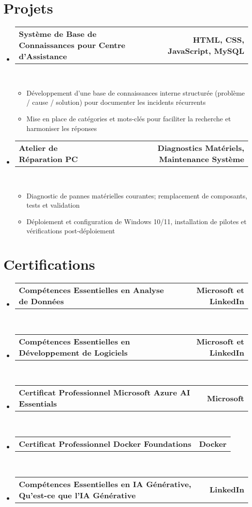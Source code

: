 \documentclass[letterpaper,11pt]{article}
\makeatletter
\newcommand{\resumeItem}[1]{
  \item\small{
    {#1 \vspace{0pt}}
  }
}
\newcommand{\resumeProjectHeading}[2]{
    \item
    \begin{tabular*}{1.001\textwidth}{l@{\extracolsep{\fill}}r}
      \small#1 & \textbf{\small #2}\\
    \end{tabular*}\vspace{-7pt}
}
\newcommand{\resumeSubHeadingListStart}{\begin{itemize}[leftmargin=0.0in, label={}]}
\newcommand{\resumeSubHeadingListEnd}{\end{itemize}}\vspace{0pt}
\newcommand{\resumeItemListStart}{\begin{itemize}}
\newcommand{\resumeItemListEnd}{\end{itemize}\vspace{-5pt}}
\makeatother
\begin{document}
\section{Projets}
    \vspace{-5pt}
    \resumeSubHeadingListStart
    \resumeProjectHeading
            {\textbf{Système de Base de Connaissances pour Centre d'Assistance}}{HTML, CSS, JavaScript, MySQL}
            \\[2mm]
          \resumeItemListStart
            \resumeItem{Développement d'une base de connaissances interne structurée (problème / cause / solution) pour documenter les incidents récurrents}
            \resumeItem{Mise en place de catégories et mots-clés pour faciliter la recherche et harmoniser les réponses}
          \resumeItemListEnd
    \resumeProjectHeading
            {\textbf{Atelier de Réparation PC}}{Diagnostics Matériels, Maintenance Système}
            \\[2mm]
          \resumeItemListStart
            \resumeItem{Diagnostic de pannes matérielles courantes; remplacement de composants, tests et validation}
            \resumeItem{Déploiement et configuration de Windows 10/11, installation de pilotes et vérifications post-déploiement}
          \resumeItemListEnd

\resumeSubHeadingListEnd
\vspace{-28pt}

\section{Certifications}
    \vspace{-5pt}
    \resumeSubHeadingListStart
          \resumeProjectHeading
            {\textbf{{Compétences Essentielles en Analyse de Données}}}{Microsoft et LinkedIn}
            \\[1mm]
          \resumeProjectHeading
            {\textbf{{Compétences Essentielles en Développement de Logiciels}}}{Microsoft et LinkedIn}
            \\[1mm]
          \resumeProjectHeading
            {\textbf{{Certificat Professionnel Microsoft Azure AI Essentials}}}{Microsoft}
            \\[1mm]
          \resumeProjectHeading
            {\textbf{{Certificat Professionnel Docker Foundations}}}{Docker}
            \\[1mm]
          \resumeProjectHeading
            {\textbf{{Compétences Essentielles en IA Générative, Qu'est-ce que l'IA Générative}}}{LinkedIn}
            \\[1mm]
          \resumeSubHeadingListEnd
 \vspace{-15pt}
\end{document}
